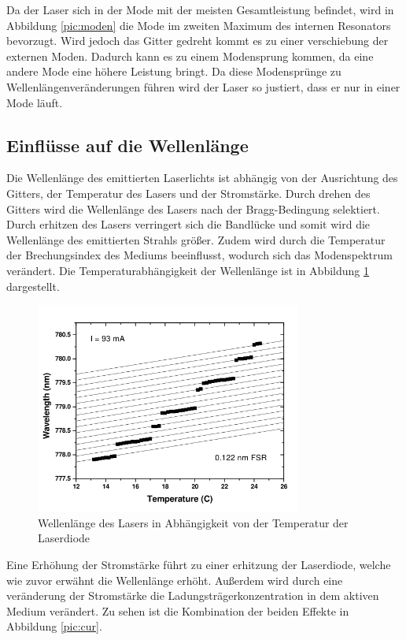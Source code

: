 Da der Laser sich in der Mode mit der meisten Gesamtleistung befindet, wird in Abbildung \ref{pic:moden} die Mode
im zweiten Maximum des internen Resonators bevorzugt. Wird jedoch das Gitter gedreht kommt es zu einer verschiebung
der externen Moden. Dadurch kann es zu einem Modensprung kommen, da eine andere Mode eine höhere Leistung bringt.
Da diese Modensprünge zu Wellenlängenveränderungen führen wird der Laser so justiert, dass er nur in einer Mode läuft.
 
\subsection{Einflüsse auf die Wellenlänge}
Die Wellenlänge des emittierten Laserlichts ist abhängig von der Ausrichtung des Gitters, der Temperatur des Lasers und
der Stromstärke. Durch drehen des Gitters wird die Wellenlänge des Lasers nach der
Bragg-Bedingung selektiert. Durch erhitzen des Lasers verringert sich die Bandlücke
und somit wird die Wellenlänge des emittierten Strahls größer. Zudem wird durch die
Temperatur der Brechungsindex des Mediums beeinflusst, wodurch sich das Modenspektrum verändert.
Die Temperaturabhängigkeit der Wellenlänge ist in Abbildung \ref{pic:temp} dargestellt.
\begin{figure}
    \centering
    \includegraphics[width = 0.78\textwidth]{pictures/tempzuwell.png}
    \caption{Wellenlänge des Lasers in Abhängigkeit von der Temperatur der Laserdiode\cite{theorie}}
    \label{pic:temp}
\end{figure}
Eine Erhöhung der Stromstärke führt zu einer erhitzung der Laserdiode, welche
wie zuvor erwähnt die Wellenlänge erhöht. Außerdem wird durch eine veränderung der Stromstärke
die Ladungsträgerkonzentration in dem aktiven Medium verändert.
Zu sehen ist die Kombination der beiden Effekte in Abbildung \ref{pic:cur}.

